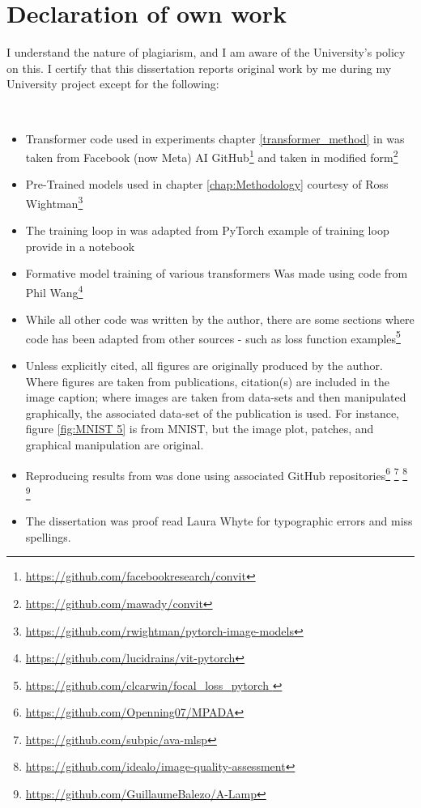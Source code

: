\chapter*{Declaration of own work}

I understand the nature of plagiarism, and I am aware of the University’s policy on this.
I certify that this dissertation reports original work by me during my University project except for the following:

\

\begin{itemize}
    \item Transformer code used in experiments chapter \ref{transformer_method} in was taken from Facebook (now Meta) AI GitHub\footnote{\href{https://github.com/facebookresearch/convit}{https://github.com/facebookresearch/convit}} and taken in modified form\footnote{\href{https://github.com/mawady/convit}{https://github.com/mawady/convit}}
    \item Pre-Trained models used in chapter \ref{chap:Methodology} courtesy of Ross Wightman\footnote{\href{https://github.com/rwightman/pytorch-image-models}{https://github.com/rwightman/pytorch-image-models}}  
    \item The training loop in was adapted from PyTorch example of training loop provide in a notebook 
    \item Formative model training of various transformers Was made using code from Phil Wang\footnote{\href{https://github.com/lucidrains/vit-pytorch}{https://github.com/lucidrains/vit-pytorch}}
    \item While all other code was written by the author, there are some sections where code has been adapted from other sources - such as loss function examples\footnote{\href{https://github.com/clcarwin }{https://github.com/clcarwin/focal\_loss\_pytorch }} 
    \item Unless explicitly cited, all figures are originally produced by the author. Where figures are taken from publications, citation(s) are included in the image caption; where images are taken from data-sets and then manipulated graphically, the associated data-set of the publication is used. For instance, figure \ref{fig:MNIST 5} is from MNIST\cite{LeCun1998}, but the image plot, patches, and graphical manipulation are original. 
    \item Reproducing results from \cite{Sheng2018a,Hosu2019,Talebi2018,Ma2017} was done using associated GitHub repositories\footnote{\href{https://github.com/Openning07/MPADA}{https://github.com/Openning07/MPADA}}
    \footnote{\href{https://github.com/subpic/ava-mlsp}{https://github.com/subpic/ava-mlsp}}
    \footnote{\href{https://github.com/idealo/image-quality-assessment}
    {https://github.com/idealo/image-quality-assessment}}
    \footnote{\href{https://github.com/GuillaumeBalezo/A-Lamp}{https://github.com/GuillaumeBalezo/A-Lamp}}
    \item The dissertation was proof read Laura Whyte for typographic errors and miss spellings. 

\end{itemize}
